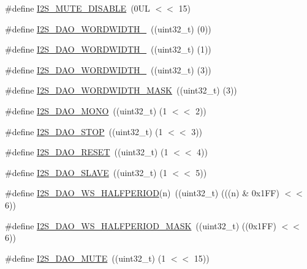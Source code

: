 \begin{DoxyCompactItemize}
\item 
\#define \hyperlink{group___i2_s__18_x_x__43_x_x_ga7d6c53914dea99eecc1d59eefbdbf5aa}{I2\+S\+\_\+\+M\+U\+T\+E\+\_\+\+D\+I\+S\+A\+B\+LE}~(0\+U\+L $<$$<$ 15)
\item 
\#define \hyperlink{group___i2_s__18_x_x__43_x_x_ga9e390ef13bf52d00c311ca64d46c5ac2}{I2\+S\+\_\+\+D\+A\+O\+\_\+\+W\+O\+R\+D\+W\+I\+D\+T\+H\+\_}~((uint32\+\_\+t) (0))
\item 
\#define \hyperlink{group___i2_s__18_x_x__43_x_x_gaf48ba0298cdb6828567de0df29abcb4d}{I2\+S\+\_\+\+D\+A\+O\+\_\+\+W\+O\+R\+D\+W\+I\+D\+T\+H\+\_}~((uint32\+\_\+t) (1))
\item 
\#define \hyperlink{group___i2_s__18_x_x__43_x_x_gaa6666d92294cc244c41fd510fb7de31d}{I2\+S\+\_\+\+D\+A\+O\+\_\+\+W\+O\+R\+D\+W\+I\+D\+T\+H\+\_}~((uint32\+\_\+t) (3))
\item 
\#define \hyperlink{group___i2_s__18_x_x__43_x_x_ga47082bef68e91e6cedb9f819b8e2fa02}{I2\+S\+\_\+\+D\+A\+O\+\_\+\+W\+O\+R\+D\+W\+I\+D\+T\+H\+\_\+\+M\+A\+SK}~((uint32\+\_\+t) (3))
\item 
\#define \hyperlink{group___i2_s__18_x_x__43_x_x_gab32b25d6de6c9c964421ff08c1402e03}{I2\+S\+\_\+\+D\+A\+O\+\_\+\+M\+O\+NO}~((uint32\+\_\+t) (1 $<$$<$ 2))
\item 
\#define \hyperlink{group___i2_s__18_x_x__43_x_x_gaa8e56c2dab6e3206093dd6575332253d}{I2\+S\+\_\+\+D\+A\+O\+\_\+\+S\+T\+OP}~((uint32\+\_\+t) (1 $<$$<$ 3))
\item 
\#define \hyperlink{group___i2_s__18_x_x__43_x_x_ga7ec4a63719a45df4d30f42e03af0d9e6}{I2\+S\+\_\+\+D\+A\+O\+\_\+\+R\+E\+S\+ET}~((uint32\+\_\+t) (1 $<$$<$ 4))
\item 
\#define \hyperlink{group___i2_s__18_x_x__43_x_x_ga58ea023dda649de724684288e703ef86}{I2\+S\+\_\+\+D\+A\+O\+\_\+\+S\+L\+A\+VE}~((uint32\+\_\+t) (1 $<$$<$ 5))
\item 
\#define \hyperlink{group___i2_s__18_x_x__43_x_x_ga3bfda0af914736d2765822daee28a489}{I2\+S\+\_\+\+D\+A\+O\+\_\+\+W\+S\+\_\+\+H\+A\+L\+F\+P\+E\+R\+I\+OD}(n)~((uint32\+\_\+t) (((n) \& 0x1\+F\+F) $<$$<$ 6))
\item 
\#define \hyperlink{group___i2_s__18_x_x__43_x_x_gaf32d949b14558ee1aad72a765726731c}{I2\+S\+\_\+\+D\+A\+O\+\_\+\+W\+S\+\_\+\+H\+A\+L\+F\+P\+E\+R\+I\+O\+D\+\_\+\+M\+A\+SK}~((uint32\+\_\+t) ((0x1\+F\+F) $<$$<$ 6))
\item 
\#define \hyperlink{group___i2_s__18_x_x__43_x_x_ga78bd42c0693e2a68dcba79a4cc05b8d5}{I2\+S\+\_\+\+D\+A\+O\+\_\+\+M\+U\+TE}~((uint32\+\_\+t) (1 $<$$<$ 15))
\item 

\end{DoxyCompactItemize}

